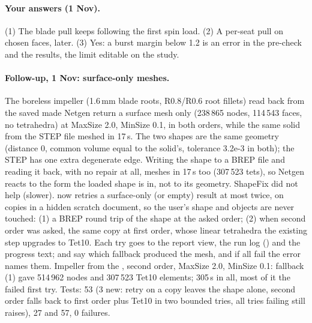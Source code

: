 \paragraph{Your answers (1 Nov).} (1) The blade pull keeps following the first spin load. (2) A per-seat pull on chosen
faces, later. (3) Yes: a burst margin below 1.2 is an error in the pre-check and the results, the limit editable on the
study.

\paragraph{Follow-up, 1 Nov: surface-only meshes.} The boreless impeller (1.6\,mm blade roots, R0.8/R0.6 root fillets) read
back from the saved  made Netgen return a surface mesh only (238\,865 nodes, 114\,543 faces, no tetrahedra) at
MaxSize 2.0, MinSize 0.1, in both orders, while the same solid from the STEP file meshed in 17\,s. The two shapes are the
same geometry (distance 0, common volume equal to the solid's, tolerance 3.2e-3 in both); the STEP has one extra degenerate
edge. Writing the  shape to a BREP file and reading it back, with no repair at all, meshes in 17\,s too
(307\,523 tets), so Netgen reacts to the form the loaded shape is in, not to its geometry. ShapeFix did not help (slower).
 now retries a surface-only (or empty) result at most twice, on copies in a hidden scratch document, so the
user's shape and objects are never touched: (1) a BREP round trip of the shape at the asked order; (2) when second order was
asked, the same copy at first order, whose linear tetrahedra the existing step upgrades to Tet10. Each try goes to the
report view, the run log () and the progress text;  and 
say which fallback produced the mesh, and if all fail the error names them. Impeller from the , second order,
MaxSize 2.0, MinSize 0.1: fallback (1) gave 514\,962 nodes and 307\,523 Tet10 elements; 305\,s in all, most of it the failed
first try. Tests:  53 (3 new: retry on a copy leaves the shape alone, second order falls back to
first order plus Tet10 in two bounded tries, all tries failing still raises),  27 and
 57, 0 failures.
